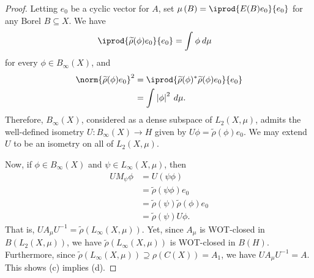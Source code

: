 \documentclass[10pt]{mypackage}
\begin{document}
\begin{proof}
  Letting $e_0$ be a cyclic vector for $A$, set $\mu\left( B \right) = \iprod{E(B)e_0}{e_0}$ for any Borel $B\subseteq X$. We have
  \begin{align*}
    \iprod{\widetilde{\rho}(\phi)e_0}{e_0} &= \int_{}^{} \phi\:d\mu
  \end{align*}
  for every $\phi\in B_{\infty}(X)$, and
  \begin{align*}
    \norm{ \widetilde{\rho}(\phi)e_0 }^2 &= \iprod{\widetilde{\rho}(\phi)^{\ast}\widetilde{\rho}(\phi)e_0}{e_0}\\
                                         &= \int_{}^{} \left\vert \phi \right\vert^2\:d\mu.
  \end{align*}
  Therefore, $B_{\infty}(X)$, considered as a dense subspace of $L_2\left( X,\mu \right)$, admits the well-defined isometry $U\colon B_{\infty}(X)\rightarrow H$ given by $U\phi = \widetilde{\rho}(\phi)e_0$. We may extend $U$ to be an isometry on all of $L_2\left( X,\mu \right)$.

  Now, if $\phi\in B_{\infty}(X)$ and $\psi\in L_{\infty}(X,\mu)$, then
  \begin{align*}
    UM_{\psi}\phi &= U\left( \psi\phi \right)\\
                  &= \widetilde{\rho}\left( \psi\phi \right)e_0\\
                  &= \widetilde{\rho}(\psi) \widetilde{\rho}(\phi) e_0\\
                  &= \widetilde{\rho}(\psi) U\phi.
  \end{align*}
  That is, $UA_{\mu}U^{-1} = \widetilde{\rho}\left( L_{\infty}\left( X,\mu \right) \right)$. Yet, since $A_{\mu}$ is WOT-closed in $B\left( L_2\left( X,\mu \right) \right)$, we have $ \widetilde{\rho}\left( L_{\infty}(X,\mu) \right) $ is WOT-closed in $B(H)$. Furthermore, since $ \widetilde{\rho}\left( L_{\infty}\left( X,\mu \right) \right)\supseteq \rho\left( C(X) \right) = A_1 $, we have $UA_{\mu}U^{-1} = A$. This shows (c) implies (d).


\end{proof}
\end{document}
